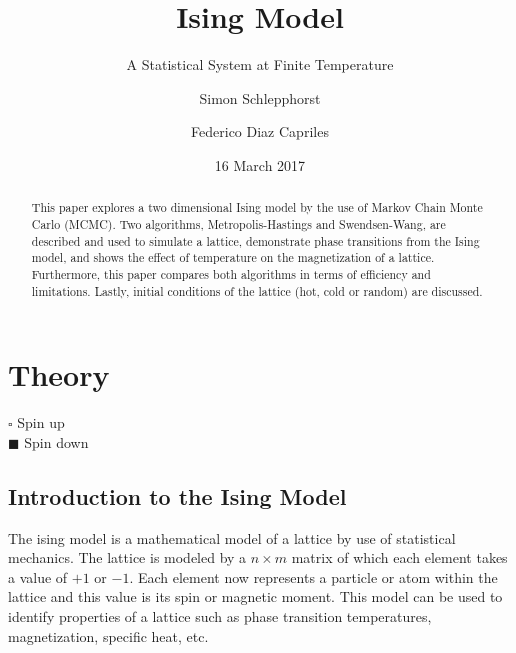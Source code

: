 \documentclass[a4]{scrartcl}
\begin{document}
\author{Simon Schlepphorst \and Federico Diaz Capriles}
\title{Ising Model}
\subtitle{A Statistical System at Finite Temperature}
\date{16 March 2017}

\maketitle

\begin{abstract}
	This paper explores a two dimensional Ising model by the use of Markov
	Chain Monte Carlo (MCMC). Two algorithms, Metropolis-Hastings and
	Swendsen-Wang, are described and used to simulate a lattice,
	demonstrate phase transitions from the Ising model, and shows the
	effect of temperature on the magnetization of a lattice. Furthermore,
	this paper compares both algorithms in terms of efficiency and
	limitations. Lastly, initial conditions of the lattice (hot, cold or
	random) are discussed.
\end{abstract}

\tableofcontents

\section{Theory}

	\begin{minipage}{.6\textwidth}
		\centering
		\label{fig:ising}
	\end{minipage}%
	\begin{minipage}[]{.4\textwidth}
		$ \square $ Spin up \\ 
		$ \blacksquare $ Spin down 
	\end{minipage}


\subsection{Introduction to the Ising Model}
The ising model is a mathematical model of a lattice by use of statistical
mechanics. The lattice is modeled by a  $ n \times m $ matrix of which each
element takes a value of $+1$ or $-1$. Each element now represents a particle
or atom within the lattice and this value is its spin or magnetic moment. This
model can be used to identify properties of a lattice such as phase transition
temperatures, magnetization, specific heat, etc.
\end{document}
